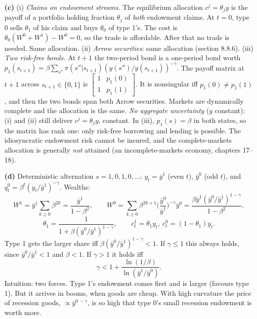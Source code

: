 \documentclass[12pt, letterpaper]{article}
\begin{document}
\begin{tcolorbox}[evenbox,title={Exercise 8.14 \quad Donated by Pierre-Olivier Weill}]
\textbf{(c)} (i) \emph{Claims on endowment streams.} The equilibrium allocation $c^j=\theta_jy$ is the payoff of a
portfolio holding fraction $\theta_j$ of \emph{both} endowment claims. At $t=0$, type 0 sells $\theta_1$ of his claim and buys
$\theta_0$ of type 1's. The cost is $\theta_0(W^0+W^1)-W^0=0$, so the trade is affordable. After that no trade is needed. Same allocation.
(ii) \emph{Arrow securities}: same allocation (section 8.8.6). (iii) \emph{Two risk-free bonds.} At $t+1$ the
two-period bond is a one-period bond worth $p_1(s_{t+1})=\beta\sum_{s''}\pi(s''|s_{t+1})(y(s'')/y(s_{t+1}))^{-\gamma}$. The
payoff matrix at $t+1$ across $s_{t+1}\in\{0,1\}$ is $\begin{bmatrix}1&p_1(0)\\1&p_1(1)\end{bmatrix}$. It is
nonsingular iff $p_1(0)\ne p_1(1)$, and then the two bonds span both Arrow securities. Markets are dynamically complete
and the allocation is the same. \emph{No aggregate uncertainty} ($y$ constant): (i) and (ii) still deliver
$c^j=\theta_jy$, constant. In (iii), $p_1(s)=\beta$ in both states, so the matrix has rank one: only risk-free
borrowing and lending is possible. The idiosyncratic endowment risk cannot be insured, and the complete-markets
allocation is generally \emph{not} attained (an incomplete-markets economy, chapters 17--18).

\textbf{(d)} Deterministic alternation $s=1,0,1,0,\dots$: $y_t=\bar y^1$ (even $t$), $\bar y^0$ (odd $t$), and
$q^0_t=\beta^t(y_t/\bar y^1)^{-\gamma}$. Wealths:
\[
W^1=\bar y^1\sum_{k\ge0}\beta^{2k}=\frac{\bar y^1}{1-\beta^2},\qquad
W^0=\sum_{k\ge0}\beta^{2k+1}\Big(\frac{\bar y^0}{\bar y^1}\Big)^{-\gamma}\bar y^0=\frac{\beta\bar y^1(\bar y^0/\bar y^1)^{1-\gamma}}{1-\beta^2},
\]
\[
\boxed{\theta_1=\frac{1}{1+\beta(\bar y^0/\bar y^1)^{1-\gamma}},\qquad c^1_t=\theta_1y_t,\ c^0_t=(1-\theta_1)y_t .}
\]
Type 1 gets the larger share iff $\beta(\bar y^0/\bar y^1)^{1-\gamma}<1$. If $\gamma\le1$ this always holds, since
$\bar y^0/\bar y^1<1$ and $\beta<1$. If $\gamma>1$ it holds iff
\[
\gamma<1+\frac{\ln(1/\beta)}{\ln(\bar y^1/\bar y^0)} .
\]
Intuition: two forces. Type 1's endowment comes first and is larger (favours type 1). But it arrives in booms,
when goods are cheap. With high curvature the price of recession goods, $\propto\bar y^{0\,-\gamma}$, is so high
that type 0's small recession endowment is worth more.


\end{tcolorbox}
\end{document}
